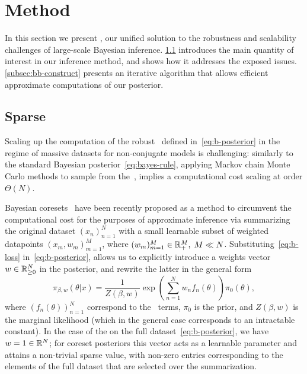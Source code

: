 \section{Method}
\label{sec:method}

In this section we present \bcores, our unified solution to the robustness and scalability challenges of large-scale Bayesian inference. \cref{subsec:sparse-b-posterior} introduces the main quantity of interest in our inference method, and shows how it addresses the exposed issues. \cref{subsec:bb-construct} presents an iterative algorithm that allows efficient approximate computations of our posterior.


\subsection{Sparse \bpost{}}
\label{subsec:sparse-b-posterior}


Scaling up the computation of the robust \bpost~defined in~\cref{eq:b-posterior} in the regime of massive datasets for non-conjugate models is challenging: similarly to the standard Bayesian posterior~\cref{eq:bayes-rule}, applying Markov chain Monte Carlo methods to sample from the~\bpost{}, implies a computational cost scaling at order $\Theta(N)$. 

Bayesian coresets~\citep{huggins16,campbell19jmlr} have been recently proposed as a method to circumvent the computational cost for the purposes of approximate inference via summarizing the original dataset  $(x_n)_{n=1}^{N}$ with a small learnable subset of weighted datapoints $(x_m, w_m)_{m=1}^{M}$, where  $(w_m)_{m=1}^{M} \in \mathbb{R}^{M}_{+},\; M \ll N$. 
Substituting~\cref{eq:b-loss} in~\cref{eq:b-posterior}, allows us to explicitly introduce a weights vector $ w \in \mathbb{R}_{\geq 0}^{N}$ in the posterior, and rewrite the latter in the general form
\[
\pi_{\beta,w}(\theta|x) 
= \frac{1}{Z(\beta, w)}  \exp\left(\sum_{n=1}^{N}w_nf_n(\theta)\right)\pi_0(\theta),
\label{eq:bcore-posterior}
\]
where $(f_n(\theta))_{n=1}^{N}$ correspond to the \blik~terms, $\pi_0$ is the prior, and $Z(\beta, w)$ is the marginal likelihood (which in the general case corresponds to an intractable constant). 
In the case of the \bpost{} on the full dataset~\cref{eq:b-posterior}, we have $w=1 \in\mathbb{R}^{N}$; for coreset posteriors this vector acts as a learnable parameter and attains a non-trivial sparse value, with non-zero entries corresponding to the elements of the full dataset that are selected over the summarization.

